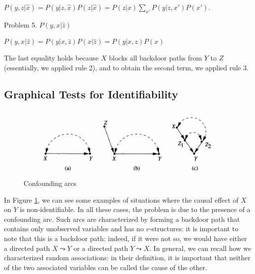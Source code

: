 \documentclass[fleqn]{article}
\numberwithin{equation}{section}
\numberwithin{theorem}{section}
\numberwithin{figure}{section}
\numberwithin{lemma}{section}
\numberwithin{corollary}{section}
\begin{document}
$P(y, z|\hat x) = P(y|z,\hat x)P(z|\hat x) = P(z|x)\sum\limits_{x'}P(y|z,x')P(x')$.

Problem 5. $P(y, x|\hat z)$

$P(y, x|\hat z) = P(y|x, \hat z) P(x|\hat z) = P(y|x,z)P(x)$

The last equality holds because $X$ blocks all backdoor paths from $Y$ to $Z$ (essentially, we applied rule 2), and to obtain the second term, we applied rule 3.

\subsection*{Graphical Tests for Identifiability}

\begin{figure}[h]
	\begin{center}
		\includegraphics[scale=0.6]{imgs/img24.png}
	\end{center}
	\caption{Confounding arcs}
	\label{fig:confounding_arcs}
\end{figure}

In Figure \ref{fig:confounding_arcs}, we can see some examples of situations where the causal effect of $X$ on $Y$ is non-identifiable. In all these cases, the problem is due to the presence of a confounding arc. Such arcs are characterized by forming a backdoor path that contains only unobserved variables and has no $v$-structures: it is important to note that this is a backdoor path: indeed, if it were not so, we would have either a directed path $X \leadsto Y$ or a directed path $Y \leadsto X$. In general, we can recall how we characterized random associations: in their definition, it is important that neither of the two associated variables can be called the cause of the other.
\end{document}
